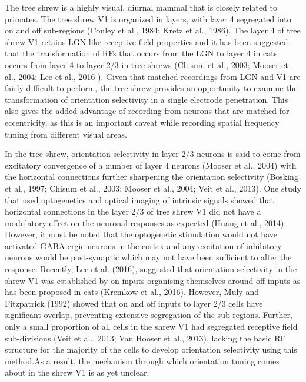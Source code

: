 The tree shrew is a highly visual, diurnal mammal that is closely related to primates. The tree shrew V1 is organized in layers, with layer 4 segregated into on and off sub-regions (Conley et al., 1984; Kretz et al., 1986). The layer 4 of tree shrew V1 retains LGN like receptive field properties and it has been suggested that the transformation of RFs that occurs from the LGN to layer 4 in cats occurs from layer 4 to layer 2/3 in tree shrews (Chisum et al., 2003; Mooser et al., 2004; Lee et al., 2016 ). Given that matched recordings from LGN and V1 are fairly difficult to perform, the tree shrew provides an opportunity to examine the transformation of orientation selectivity in a single electrode penetration. This also gives the added advantage of recording from neurons that are matched for eccentricity, as this is an important caveat while recording spatial frequency tuning from different visual areas.

In the tree shrew, orientation selectivity in layer 2/3 neurons is said to come from excitatory convergence of a number of layer 4 neurons (Mooser et al., 2004) with the horizontal connections further sharpening the orientation selectivity (Bosking et al., 1997; Chisum et al., 2003; Mooser et al., 2004; Veit et al., 2013). One study that used optogenetics and optical imaging of intrinsic signals showed that horizontal connections in the layer 2/3 of tree shrew V1 did not have a modulatory effect on the neuronal responses as expected (Huang et al., 2014). However, it must be noted that the optogenetic stimulation would not have activated GABA-ergic neurons in the cortex and any excitation of inhibitory neurons would be post-synaptic which may not have been sufficient to alter the response. Recently, Lee et al. (2016), suggested that orientation selectivity in the shrew V1 was established by on inputs organising themselves around off inputs as has been proposed in cats (Kremkow et al., 2016). However, Muly and Fitzpatrick (1992) showed that on and off inputs to layer 2/3 cells have significant overlap, preventing extensive segregation of the sub-regions. Further, only a small proportion of all cells in the shrew V1 had segregated receptive field sub-divisions (Veit et al., 2013; Van Hooser et al., 2013), lacking the basic RF structure for the majority of the cells to develop orientation selectivity using this method.As a result, the mechanism through which orientation tuning comes about in the shrew V1 is as yet unclear.

